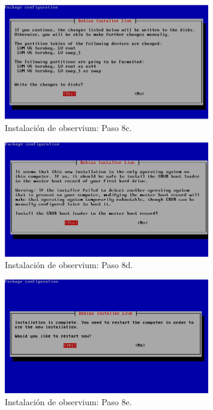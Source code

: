 \begin{figure}[htbp!]
	\centering
		\includegraphics[width=0.8\textwidth]{images/desarrollo/instalarObservium_paso8c.png}
	\caption{Instalación de observium: Paso 8c.}
\end{figure}

\begin{figure}[htbp!]
	\centering
		\includegraphics[width=0.8\textwidth]{images/desarrollo/instalarObservium_paso8d.png}
	\caption{Instalación de observium: Paso 8d.}
\end{figure}

\begin{figure}[htbp!]
	\centering
		\includegraphics[width=0.8\textwidth]{images/desarrollo/instalarObservium_paso8e.png}
	\caption{Instalación de observium: Paso 8e.}
\end{figure}

